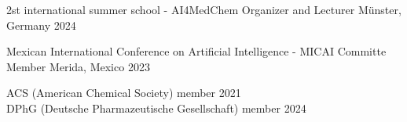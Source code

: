 

\begin{cvhonors}
  \cvhonor
    {2st international summer school - AI4MedChem} %
    {Organizer and Lecturer} %
    {Münster, Germany} %
    {2024} %

    \cvhonor
    {Mexican International Conference on Artificial Intelligence - MICAI} %
    {Committe Member} %
    {Merida, Mexico} %
    {2023} %

\end{cvhonors}


\begin{cvpubs}
\end{cvpubs}




\begin{small} \color{black}
ACS (American Chemical Society) member 2021 \\
DPhG (Deutsche Pharmazeutische Gesellschaft) member 2024 \\
\end{small}
